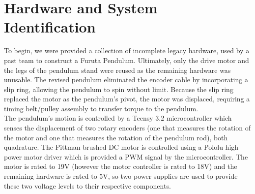 \documentclass[12pt]{extarticle}
\newenvironment{sect}
  {\adjustwidth{-2.25em}{0pt}}
  {\endadjustwidth}
\begin{document}
\begin{sect}
\section{Hardware and System Identification}%
    To begin, we were provided a collection of incomplete legacy hardware, used by a past team to construct a Furuta Pendulum. Ultimately, only the drive motor and the legs of the pendulum stand were reused as the remaining hardware was unusable. The revised pendulum eliminated the encoder cable by incorporating a slip ring, allowing the pendulum to spin without limit. Because the slip ring replaced the motor as the pendulum's pivot, the motor was displaced, requiring a timing belt/pulley assembly to transfer torque to the pendulum.\\
    The pendulum's motion is controlled by a Teensy 3.2 microcontroller which senses the displacement of two rotary encoders (one that measures the rotation of the motor and one that measures the rotation of the pendulum rod), both quadrature. The Pittman brushed DC motor is controlled using a Pololu high power motor driver which is provided a PWM signal by the microcontroller. The motor is rated to 19V (however the motor controller is rated to 18V) and the remaining hardware is rated to 5V, so two power supplies are used to provide these two voltage levels to their respective components.\\
    

\end{sect}
\end{document}
